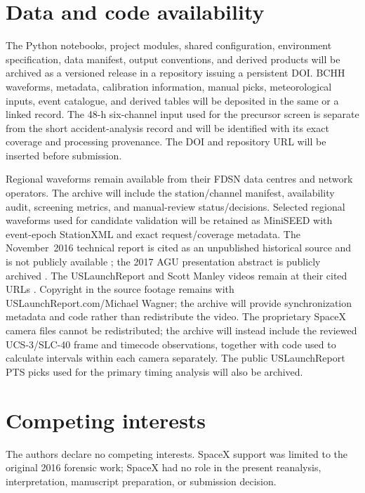 \documentclass[]{seismica}
\begin{document}
\section*{Data and code availability}

The Python notebooks, project modules, shared configuration, environment
specification, data manifest, output conventions, and derived products will be
archived as a versioned release in a repository issuing a persistent DOI. BCHH
waveforms, metadata, calibration information, manual picks, meteorological
inputs, event catalogue, and derived tables will be deposited in the same or a
linked record. The 48-h six-channel input used for the precursor screen is
separate from the short accident-analysis record and will be identified with
its exact coverage and processing provenance. The DOI and repository URL will be inserted before submission.

Regional waveforms remain available from their FDSN data centres and network
operators. The archive will include the station/channel manifest, availability
audit, screening metrics, and manual-review status/decisions. Selected regional
waveforms used for candidate validation will be retained as MiniSEED with
event-epoch StationXML and exact request/coverage metadata. The November~2016
technical report is cited as an unpublished historical source and is not
publicly available \citep{thompson_mcnutt_fireball_2016}; the 2017 AGU
presentation abstract is publicly archived \citep{thompson_agu_falcon9_2017}. 
The USLaunchReport and Scott Manley videos remain at their cited URLs
\citep{uslaunchreport_amos6_video_2016,manley_spacex_explosion_2016}. Copyright
in the source footage remains with USLaunchReport.com/Michael Wagner; the
archive will provide synchronization metadata and code rather than redistribute
the video. The proprietary SpaceX camera files cannot be redistributed; the archive
will instead include the reviewed UCS-3/SLC-40 frame and timecode observations,
together with code used to calculate intervals within each camera separately.
The public USLaunchReport PTS picks used for the primary timing analysis will
also be archived.


\section*{Competing interests}

The authors declare no competing interests. SpaceX support was limited to the
original 2016 forensic work; SpaceX had no role in the present reanalysis,
interpretation, manuscript preparation, or submission decision.


\end{document}
